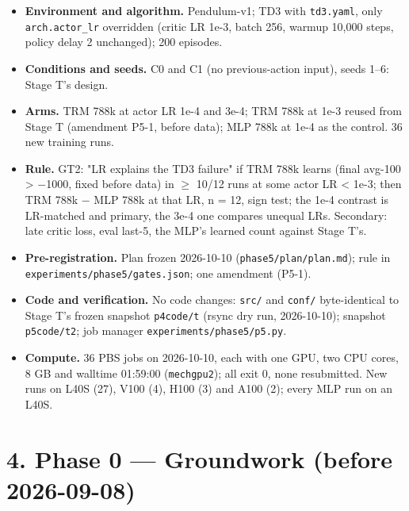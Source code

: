 \documentclass[11pt]{article}
\begin{document}
\begin{itemize}
\item \textbf{Environment and algorithm.} Pendulum-v1; TD3 with \texttt{td3.yaml}, only \texttt{arch.actor\_lr} overridden (critic LR 1e-3, batch 256, warmup 10,000 steps, policy delay 2 unchanged); 200 episodes.
\item \textbf{Conditions and seeds.} C0 and C1 (no previous-action input), seeds 1--6: Stage T's design.
\item \textbf{Arms.} TRM 788k at actor LR 1e-4 and 3e-4; TRM 788k at 1e-3 reused from Stage T (amendment P5-1, before data); MLP 788k at 1e-4 as the control. 36 new training runs.
\item \textbf{Rule.} GT2: "LR explains the TD3 failure" if TRM 788k learns (final avg-100 > $-$1000, fixed before data) in $\geq$ 10/12 runs at some actor LR < 1e-3; then TRM 788k $-$ MLP 788k at that LR, n = 12, sign test; the 1e-4 contrast is LR-matched and primary, the 3e-4 one compares unequal LRs. Secondary: late critic loss, eval last-5, the MLP's learned count against Stage T's.
\item \textbf{Pre-registration.} Plan frozen 2026-10-10 (\texttt{phase5/\allowbreak{}plan/\allowbreak{}plan.\allowbreak{}md}); rule in \texttt{experiments/\allowbreak{}phase5/\allowbreak{}gates.\allowbreak{}json}; one amendment (P5-1).
\item \textbf{Code and verification.} No code changes: \texttt{src/} and \texttt{conf/} byte-identical to Stage T's frozen snapshot \texttt{p4code/t} (rsync dry run, 2026-10-10); snapshot \texttt{p5code/t2}; job manager \texttt{experiments/\allowbreak{}phase5/\allowbreak{}p5.\allowbreak{}py}.
\item \textbf{Compute.} 36 PBS jobs on 2026-10-10, each with one GPU, two CPU cores, 8 GB and walltime 01:59:00 (\texttt{mechgpu2}); all exit 0, none resubmitted. New runs on L40S (27), V100 (4), H100 (3) and A100 (2); every MLP run on an L40S.
\end{itemize}







\medskip



\section*{4. Phase 0 --- Groundwork (before 2026-09-08)}
\end{document}
